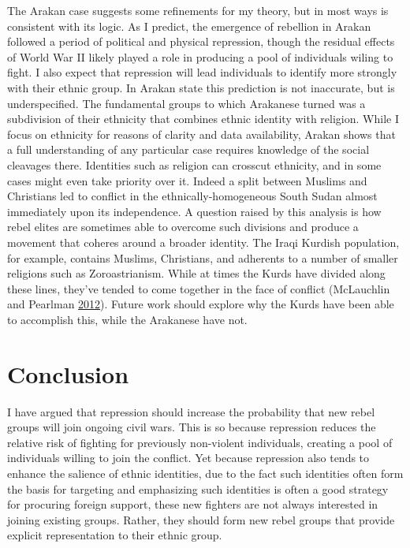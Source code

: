 \documentclass[12pt,]{book}
\theoremstyle{definition}
\theoremstyle{definition}
\theoremstyle{definition}
\theoremstyle{remark}
\begin{document}
The Arakan case suggests some refinements for my theory, but in most
ways is consistent with its logic. As I predict, the emergence of
rebellion in Arakan followed a period of political and physical
repression, though the residual effects of World War II likely played a
role in producing a pool of individuals wiling to fight. I also expect
that repression will lead individuals to identify more strongly with
their ethnic group. In Arakan state this prediction is not inaccurate,
but is underspecified. The fundamental groups to which Arakanese turned
was a subdivision of their ethnicity that combines ethnic identity with
religion. While I focus on ethnicity for reasons of clarity and data
availability, Arakan shows that a full understanding of any particular
case requires knowledge of the social cleavages there. Identities such
as religion can crosscut ethnicity, and in some cases might even take
priority over it. Indeed a split between Muslims and Christians led to
conflict in the ethnically-homogeneous South Sudan almost immediately
upon its independence. A question raised by this analysis is how rebel
elites are sometimes able to overcome such divisions and produce a
movement that coheres around a broader identity. The Iraqi Kurdish
population, for example, contains Muslims, Christians, and adherents to
a number of smaller religions such as Zoroastrianism. While at times the
Kurds have divided along these lines, they've tended to come together in
the face of conflict (McLauchlin and Pearlman
\protect\hyperlink{ref-McLauchlin2012}{2012}). Future work should
explore why the Kurds have been able to accomplish this, while the
Arakanese have not.

\hypertarget{entry-conclusion}{%
\section{Conclusion}\label{entry-conclusion}}

I have argued that repression should increase the probability that new
rebel groups will join ongoing civil wars. This is so because repression
reduces the relative risk of fighting for previously non-violent
individuals, creating a pool of individuals willing to join the
conflict. Yet because repression also tends to enhance the salience of
ethnic identities, due to the fact such identities often form the basis
for targeting and emphasizing such identities is often a good strategy
for procuring foreign support, these new fighters are not always
interested in joining existing groups. Rather, they should form new
rebel groups that provide explicit representation to their ethnic group.
\end{document}
